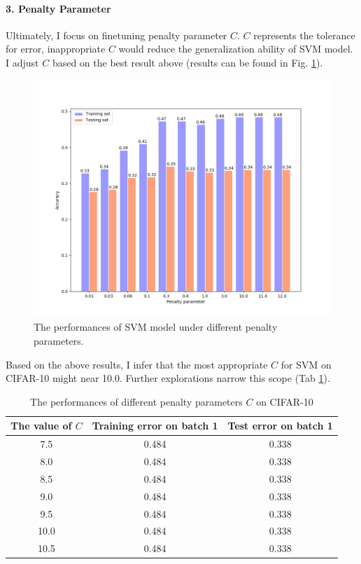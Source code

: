 \documentclass[12pt,a4paper]{article}
\theoremstyle{definition}
\begin{document}
\paragraph{3. Penalty Parameter}

Ultimately, I focus on finetuning penalty parameter $C$. $C$ represents the tolerance for error, inappropriate $C$ would reduce the generalization ability of SVM model. I adjust $C$ based on the best result above (results can be found in Fig. \ref{fig:penalty-para}).

\begin{figure}[H]
	\centering
	\includegraphics[width=0.65\linewidth]{img/para_penalty.png}
	\caption{The performances of SVM model under different penalty parameters.}
	\label{fig:penalty-para}
\end{figure}

Based on the above results, I infer that the most appropriate $C$ for SVM on CIFAR-10 might near 10.0. Further explorations narrow this scope (Tab \ref{tab:penalty-para}).

\begin{table}[H]
	\renewcommand\arraystretch{1.35}
	\caption{The performances of different penalty parameters $C$ on CIFAR-10}
	\label{tab:penalty-para}
	\centering
	
	\begin{tabular}{c|c|c}
		\centering
		The value of $C$ & Training error on batch 1 & Test error on batch 1 \\
		\hline
		\hline
		
		7.5 & 0.484 & 0.338 \\
		8.0 & 0.484 & 0.338 \\
		8.5 & 0.484 & 0.338 \\
		9.0 & 0.484 & 0.338 \\
		9.5 & 0.484 & 0.338 \\
		10.0 & 0.484 & 0.338 \\
		10.5 & 0.484 & 0.338 \\
	\end{tabular}
\end{table}
\end{document}
